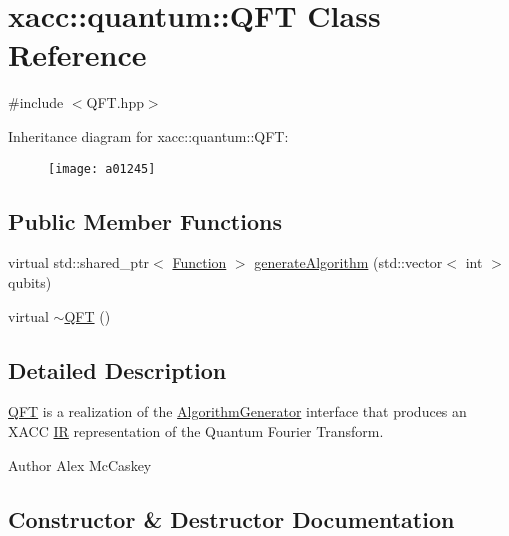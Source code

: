 \hypertarget{a01245}{}\section{xacc\+:\+:quantum\+:\+:Q\+FT Class Reference}
\label{a01245}


{\ttfamily \#include $<$Q\+F\+T.\+hpp$>$}

Inheritance diagram for xacc\+:\+:quantum\+:\+:Q\+FT\+:\begin{figure}[H]
\begin{center}
\leavevmode
\texttt{[image: a01245]}
\end{center}
\end{figure}
\subsection*{Public Member Functions}
\begin{DoxyCompactItemize}
\item 
virtual std\+::shared\+\_\+ptr$<$ \hyperlink{a01653}{Function} $>$ \hyperlink{a01245_ac093c288bc9fc069464fc3fd2cc0ac21}{generate\+Algorithm} (std\+::vector$<$ int $>$ qubits)
\item 
virtual \hyperlink{a01245_a2f585738386f9a3744498983cd1f094e}{$\sim$\+Q\+FT} ()
\end{DoxyCompactItemize}


\subsection{Detailed Description}
\hyperlink{a01245}{Q\+FT} is a realization of the \hyperlink{a01645}{Algorithm\+Generator} interface that produces an X\+A\+CC \hyperlink{a01677}{IR} representation of the Quantum Fourier Transform.

\begin{DoxyAuthor}{Author}
Alex Mc\+Caskey 
\end{DoxyAuthor}


\subsection{Constructor \& Destructor Documentation}
\mbox{\label{a01245_a2f585738386f9a3744498983cd1f094e}} 
